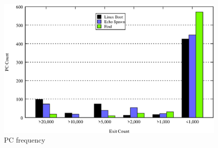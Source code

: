 \documentclass[10pt,twocolumn]{article}
\begin{document}
\begin{figure}[!htb]
\centering

\includegraphics[scale=0.5]{pc_count.eps}
\caption{PC frequency}
\label{fig:pc_profile}
\end{figure}
\end{document}

